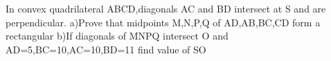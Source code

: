 In convex quadrilateral ABCD,diagonals AC and BD intersect at S and are perpendicular.
a)Prove that midpoints M,N,P,Q of AD,AB,BC,CD form a rectangular
b)If diagonals of MNPQ intersect O and AD=5,BC=10,AC=10,BD=11 find value of SO
